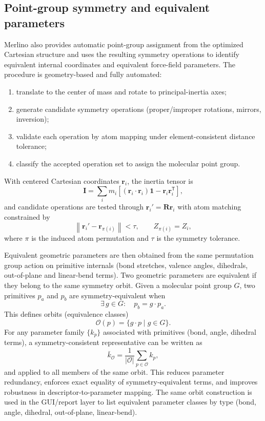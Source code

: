 \documentclass[journal=jctcce,manuscript=article]{achemso}
\begin{document}
\subsection{Point-group symmetry and equivalent parameters}
Merlino also provides automatic point-group assignment from the optimized Cartesian structure and uses the resulting symmetry operations to identify equivalent internal coordinates and equivalent force-field parameters.
The procedure is geometry-based and fully automated:
\begin{enumerate}
\item translate to the center of mass and rotate to principal-inertia axes;
\item generate candidate symmetry operations (proper/improper rotations, mirrors, inversion);
\item validate each operation by atom mapping under element-consistent distance tolerance;
\item classify the accepted operation set to assign the molecular point group.
\end{enumerate}
With centered Cartesian coordinates $\mathbf{r}_i$, the inertia tensor is
\begin{equation}
\mathbf{I}=\sum_i m_i\left[(\mathbf{r}_i\cdot\mathbf{r}_i)\mathbf{1}-\mathbf{r}_i\mathbf{r}_i^\mathsf{T}\right],
\end{equation}
and candidate operations are tested through $\mathbf{r}_i'=\mathbf{R}\mathbf{r}_i$ with atom matching constrained by
\begin{equation}
\left\lVert \mathbf{r}_i'-\mathbf{r}_{\pi(i)}\right\rVert < \tau,
\qquad
Z_{\pi(i)}=Z_i,
\end{equation}
where $\pi$ is the induced atom permutation and $\tau$ is the symmetry tolerance.

Equivalent geometric parameters are then obtained from the same permutation group action on primitive internals (bond stretches, valence angles, dihedrals, out-of-plane and linear-bend terms). Two geometric parameters are equivalent if they belong to the same symmetry orbit.
Given a molecular point group $G$, two primitives $p_a$ and $p_b$ are symmetry-equivalent when
\begin{equation}
\exists\, g\in G:\quad p_b=g\cdot p_a.
\end{equation}
This defines orbits (equivalence classes)
\begin{equation}
\mathcal{O}(p)=\{g\cdot p\;|\;g\in G\}.
\end{equation}
For any parameter family $\{k_p\}$ associated with primitives (bond, angle, dihedral terms), a symmetry-consistent representative can be written as
\begin{equation}
\bar{k}_{\mathcal{O}}=\frac{1}{|\mathcal{O}|}\sum_{p\in\mathcal{O}}k_p,
\end{equation}
and applied to all members of the same orbit. This reduces parameter redundancy, enforces exact equality of symmetry-equivalent terms, and improves robustness in descriptor-to-parameter mapping.
The same orbit construction is used in the GUI/report layer to list equivalent parameter classes by type (bond, angle, dihedral, out-of-plane, linear-bend).
\end{document}
